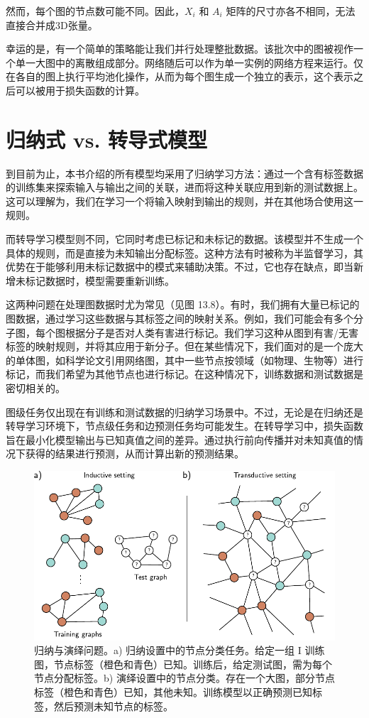 \documentclass[lang=cn,newtx,10pt,scheme=chinese]{elegantbook}
\begin{document}
然而，每个图的节点数可能不同。因此，\(X_i\) 和 \(A_i\) 矩阵的尺寸亦各不相同，无法直接合并成3D张量。

幸运的是，有一个简单的策略能让我们并行处理整批数据。该批次中的图被视作一个单一大图中的离散组成部分。网络随后可以作为单一实例的网络方程来运行。仅在各自的图上执行平均池化操作，从而为每个图生成一个独立的表示，这个表示之后可以被用于损失函数的计算。
\section{归纳式 vs. 转导式模型}
到目前为止，本书介绍的所有模型均采用了归纳学习方法：通过一个含有标签数据的训练集来探索输入与输出之间的关联，进而将这种关联应用到新的测试数据上。这可以理解为，我们在学习一个将输入映射到输出的规则，并在其他场合使用这一规则。

而转导学习模型则不同，它同时考虑已标记和未标记的数据。该模型并不生成一个具体的规则，而是直接为未知输出分配标签。这种方法有时被称为半监督学习，其优势在于能够利用未标记数据中的模式来辅助决策。不过，它也存在缺点，即当新增未标记数据时，模型需要重新训练。

这两种问题在处理图数据时尤为常见（见图 13.8）。有时，我们拥有大量已标记的图数据，通过学习这些数据与其标签之间的映射关系。例如，我们可能会有多个分子图，每个图根据分子是否对人类有害进行标记。我们学习这种从图到有害/无害标签的映射规则，并将其应用于新分子。但在某些情况下，我们面对的是一个庞大的单体图，如科学论文引用网络图，其中一些节点按领域（如物理、生物等）进行标记，而我们希望为其他节点也进行标记。在这种情况下，训练数据和测试数据是密切相关的。

图级任务仅出现在有训练和测试数据的归纳学习场景中。不过，无论是在归纳还是转导学习环境下，节点级任务和边预测任务均可能发生。在转导学习中，损失函数旨在最小化模型输出与已知真值之间的差异。通过执行前向传播并对未知真值的情况下获得的结果进行预测，从而计算出新的预测结果。

\begin{figure}[ht!]
\centering
\includegraphics[width=0.7\linewidth]{PDFFigures/UDLChap13PDF/GraphInductiveTransductive.pdf}
\caption{归纳与演绎问题。a) 归纳设置中的节点分类任务。给定一组 I 训练图，节点标签（橙色和青色）已知。训练后，给定测试图，需为每个节点分配标签。b) 演绎设置中的节点分类。存在一个大图，部分节点标签（橙色和青色）已知，其他未知。训练模型以正确预测已知标签，然后预测未知节点的标签。}
\end{figure}
\end{document}
